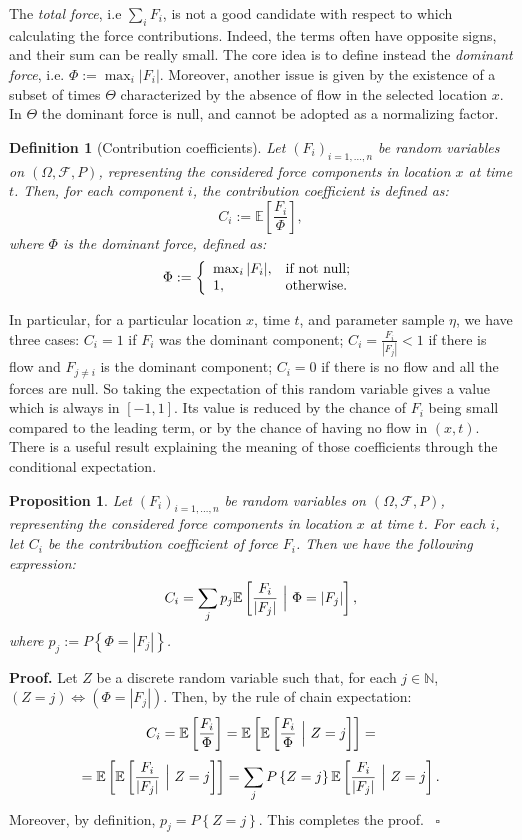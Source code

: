 \documentclass{article}
\newtheorem{definition}[theorem]{Definition}
\newtheorem{proposition}[theorem]{Proposition}
\newenvironment{proof}[1][Proof]{\noindent\textbf{#1.} }{\ $\square$}
\begin{document}
The \emph{total force}, i.e $\sum_i F_i$, is not a good candidate with respect to which calculating the force contributions. Indeed, the terms often have opposite signs, and their sum can be really small. The core idea is to define instead the \emph{dominant force}, i.e. $\Phi:=\max_i |F_i|$. Moreover, another issue is given by the existence of a subset of times $\Theta$ characterized by the absence of flow in the selected location $x$. In $\Theta$ the dominant force is null, and cannot be adopted as a normalizing factor.

\begin{definition}[Contribution coefficients]
Let $(F_i)_{i=1,\dots, n}$ be random variables on $(\Omega, \mathcal F, P)$, representing the considered force components in location $x$ at time $t$. Then, for each component $i$, the contribution coefficient is defined as:
$$C_i:=\mathbb E\left[\frac{F_i}{\Phi}\right],$$
where $\Phi$ is the dominant force, defined as:
$$\Phi:=\left\{
    \begin{array}{ll}
      \max_i |F_i|, & \hbox{if not null;} \\
      1, & \hbox{otherwise.}
    \end{array}
  \right.$$
\end{definition}

In particular, for a particular location $x$, time $t$, and parameter sample $\eta$, we have three cases: $C_i=1$ if $F_i$ was the dominant component; $C_i=\frac{F_i}{|F_j|}<1$ if there is flow and $F_{j\neq i}$ is the dominant component; $C_i=0$ if there is no flow and all the forces are null. So taking the expectation of this random variable gives a value which is always in $[-1,1]$. Its value is reduced by the chance of $F_i$ being small compared to the leading term, or by the chance of having no flow in $(x,t)$. There is a useful result explaining the meaning of those coefficients through the conditional expectation.

\begin{proposition}
Let $(F_i)_{i=1,\dots, n}$ be random variables on $(\Omega, \mathcal F, P)$, representing the considered force components in location $x$ at time $t$. For each $i$, let $C_i$ be the contribution coefficient of force $F_i$. Then we have the following expression:
$$C_i=\sum_j p_j \mathbb E\left[\frac{F_i}{|F_j|}\ \Big{|}\ \Phi=|F_j|\right],$$
where $p_j:=P\left\{\Phi=|F_j|\right\}$.
\end{proposition}

\begin{proof}
Let $Z$ be a discrete random variable such that, for each $j\in\mathbb N$, $(Z=j) \Longleftrightarrow (\Phi=|F_j|)$. Then, by the rule of chain expectation:
$$C_i=\mathbb E\left[\frac{F_i}{\Phi}\right]=\mathbb E\left[\mathbb E\left[\frac{F_i}{\Phi}\ \Big{|}\ Z=j\right]\right]=$$
$$=\mathbb E\left[\mathbb E\left[\frac{F_i}{|F_j|}\ \Big{|}\ Z=j\right]\right]=\sum_j P\left\{Z=j\right\} \mathbb E\left[\frac{F_i}{|F_j|}\ \Big{|}\ Z=j\right].$$
Moreover, by definition, $p_j=P\left\{Z=j\right\}$. This completes the proof.
\end{proof}
\end{document}
